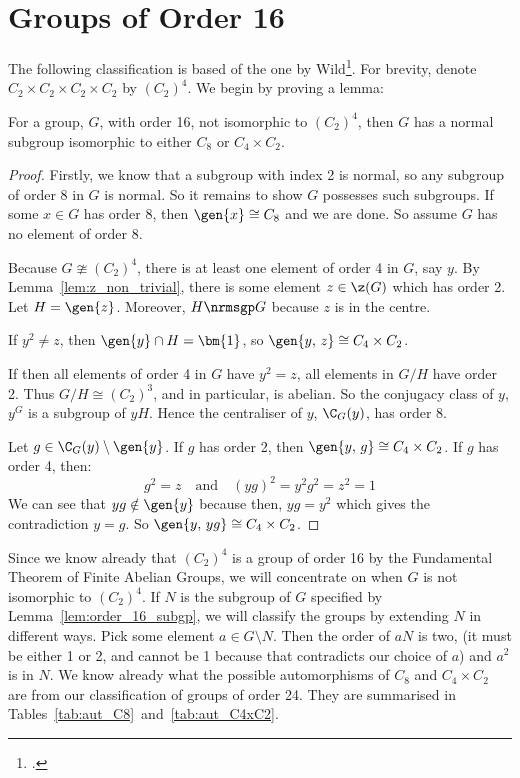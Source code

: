 \section{Groups of Order 16}
The following classification is based of the one by Wild\footcite{order16}.
For brevity, denote \(C_2 \times C_2 \times C_2 \times C_2\) by \({(C_2)}^4\).
We begin by proving a lemma:

\begin{lemma}\label{lem:order_16_subgp}
    For a group, \(G\), with order 16, not isomorphic to \({(C_2)}^4\), then \(G\) has a
    normal subgroup isomorphic to either \(C_8\) or \(C_4 \times C_2\).
\end{lemma}

\begin{proof}
    Firstly, we know that a subgroup with index 2 is normal, so any subgroup of order 8 in \(G\) is normal.
    So it remains to show \(G\) possesses such subgroups.
    If some \(x \in G\) has order 8, then \(\gen{x} \cong C_8\) and we are done.
    So assume \(G\) has no element of order 8.

    Because \(G \ncong {(C_2)}^4\), there is at least one element of order 4 in \(G\), say \(y\).
    By Lemma~\ref{lem:z_non_trivial}, there is some element \(z \in \z(G)\) which has order 2.
    Let \(H = \gen{z}\).
    Moreover, \(H \nrmsgp G\) because \(z\) is in the centre.

    If \(y^2 \neq z\), then \(\gen{y} \cap H = \bm{1}\), so \(\gen{y,\,z} \cong C_4 \times C_2\).

    If then all elements of order 4 in \(G\) have \(y^2 = z\), all elements in \(G/H\) have order 2.
    Thus \(G/H \cong {(C_2)}^3\), and in particular, is abelian.
    So the conjugacy class of \(y\), \(y^G\) is a subgroup of \(yH\).
    Hence the centraliser of \(y\), \(\C_G(y)\), has order 8.

    Let \(g \in \C_G(y) \setminus \gen{y}\).
    If \(g\) has order 2, then \(\gen{y,\,g} \cong C_4 \times C_2\).
    If \(g\) has order 4, then:
    \[g^2 = z \quad \text{and} \quad {(yg)}^2 = y^2 g^2 = z^2 = 1\]
    We can see that \(yg \notin \gen{y}\) because then, \(yg = y^2\) which gives the contradiction \(y = g\).
    So \(\gen{y,\,yg} \cong C_4 \times C_2\).
\end{proof}

Since we know already that \({(C_2)}^4\) is a group of order 16 by the Fundamental Theorem of Finite Abelian Groups, we
will concentrate on when \(G\) is not isomorphic to \({(C_2)}^4\).
If \(N\) is the subgroup of \(G\) specified by Lemma~\ref{lem:order_16_subgp}, we will classify the groups by extending
\(N\) in different ways.
Pick some element \(a \in G \setminus N\).
Then the order of \(aN\) is two, (it must be either 1 or 2, and cannot be 1 because that contradicts our choice of
\(a\)) and \(a^2\) is in \(N\).
We know already what the possible automorphisms of \(C_8\) and \(C_4 \times C_2\) are from our classification of groups
of order 24.
They are summarised in Tables~\ref{tab:aut_C8}~and~\ref{tab:aut_C4xC2}.

